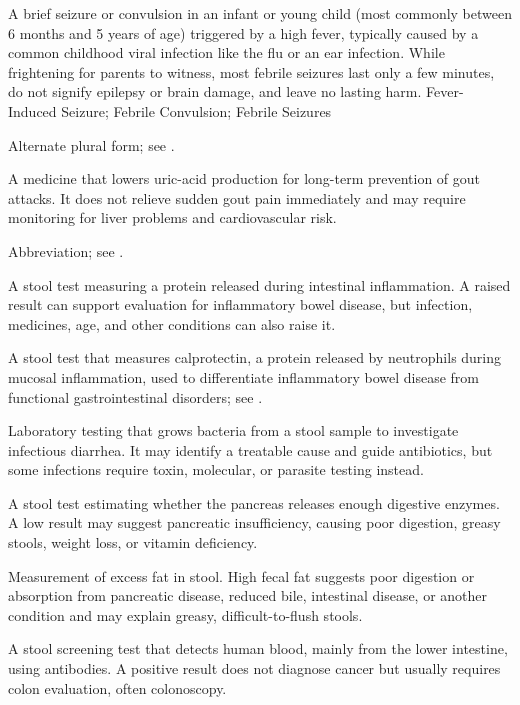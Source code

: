  A brief seizure or convulsion in an infant or young child (most commonly between 6 months and 5 years of age) triggered by a high fever, typically caused by a common childhood viral infection like the flu or an ear infection. While frightening for parents to witness, most febrile seizures last only a few minutes, do not signify epilepsy or brain damage, and leave no lasting harm.
\synonyms
Fever-Induced Seizure; Febrile Convulsion; Febrile Seizures

 Alternate plural form; see .

 A medicine that lowers uric-acid production for long-term prevention of gout attacks. It does not relieve sudden gout pain immediately and may require monitoring for liver problems and cardiovascular risk.

 Abbreviation; see .

 A stool test measuring a protein released during intestinal inflammation. A raised result can support evaluation for inflammatory bowel disease, but infection, medicines, age, and other conditions can also raise it.

 A stool test that measures calprotectin, a protein released by neutrophils during mucosal inflammation, used to differentiate inflammatory bowel disease from functional gastrointestinal disorders; see .

 Laboratory testing that grows bacteria from a stool sample to investigate infectious diarrhea. It may identify a treatable cause and guide antibiotics, but some infections require toxin, molecular, or parasite testing instead.

 A stool test estimating whether the pancreas releases enough digestive enzymes. A low result may suggest pancreatic insufficiency, causing poor digestion, greasy stools, weight loss, or vitamin deficiency.

 Measurement of excess fat in stool. High fecal fat suggests poor digestion or absorption from pancreatic disease, reduced bile, intestinal disease, or another condition and may explain greasy, difficult-to-flush stools.

 A stool screening test that detects human blood, mainly from the lower intestine, using antibodies. A positive result does not diagnose cancer but usually requires colon evaluation, often colonoscopy.

